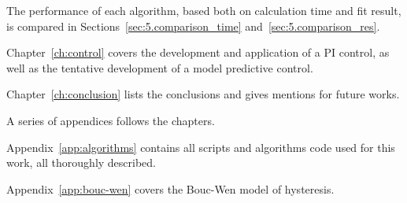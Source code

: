 The performance of each algorithm, based both on calculation time and fit result,
is compared in Sections~\ref{sec:5.comparison_time} and~\ref{sec:5.comparison_res}.

Chapter~\ref{ch:control} covers the development and application of a PI control,
as well as the tentative development of a model predictive control.

Chapter~\ref{ch:conclusion} lists the conclusions and gives mentions for future works.

A series of appendices follows the chapters.

Appendix~\ref{app:algorithms} contains
all scripts and algorithms code used for this work, all thoroughly described.

Appendix~\ref{app:bouc-wen} covers the Bouc-Wen model of hysteresis.

